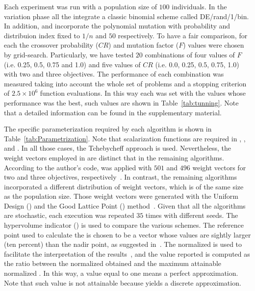 Each experiment was run with a population size of $100$ individuals.
%
In the variation phase all the \MOEAS{} integrate a classic binomial \DE{} scheme called DE/rand/1/bin.
%
In addition, \MOEAD{} and \VSDMOEAD{} incorporate the polynomial mutation with probability and distribuion index fixed to $1/n$ and $50$ respectively.
%
To have a fair comparison, for each \MOEA{} the crossover probability ($CR$) and mutation factor ($F$) values were chosen by grid-search.
%
Particularly, we have tested $20$ combinations of four values of $F$ (i.e. 0.25, 0.5, 0.75 and 1.0) and five values of $CR$ (i.e. 0.0, 0.25, 0.5, 0.75, 1.0) with two and three objectives.
%
The performance of each combination was measured taking into account the whole set of problems and a stopping criterion of  $2.5 \times 10^{6}$ function evaluations.
%
In this way each \MOEA{} was set with the values whose performance was the best, such values are shown in Table~\ref{tab:tunning}. Note that a detailed information can be found in the supplementary material.
%

%
The specific parameterization required by each algorithm is shown in Table~\ref{tab:Parametrization}.
%
Note that scalarization functions are required in \MOEADDE{}, \RMOEA{}, \NSGAIII{} and \VSDMOEAD{}.
%
In all those cases, the Tchebycheff approach is used.
%
Nevertheless, the weight vectors employed in \RMOEA{} are distinct that in the remaining algorithms.
%
According to the author's code, \RMOEA{} was applied with $501$ and $496$ weight vectors for two and three objectives, respectively~\cite{trautmann2013r2}.
%
In contrast, the remaining algorithms incorporated a different distribution of weight vectors, which is of the same size as the population size.
%
Those weight vectors were generated with the Uniform Design (\UD{}) and the Good Lattice Point (\GLP{}) method~\cite{tan2013moea1, tan2013moea2}.
%
Given that all the algorithms are stochastic, each execution was repeated $35$ times with different seeds.
%
The hypervolume indicator (\HV{}) is used to compare the various schemes.
%
The reference point used to calculate the \HV{} is chosen to be a vector whose values are sightly larger (ten percent) than the nadir point, as suggested in~\cite{ishibuchi2017reference}.
%
The normalized \HV{} is used to facilitate the interpretation of the results~\cite{li2014evolutionary}, and the value reported is computed as the ratio between the normalized \HV{} obtained and the maximum attainable normalized \HV{}.
%
In this way, a value equal to one means a perfect approximation.
%
Note that such value is not attainable because \MOEAS{} yields a discrete approximation.
%

